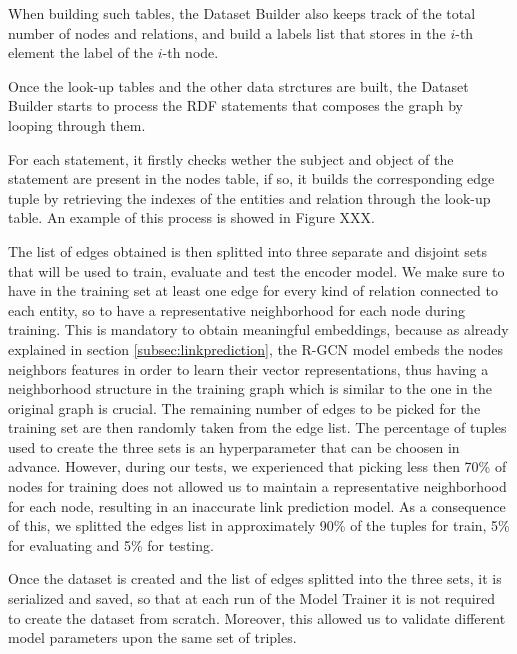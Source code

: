 \documentclass[%
    corpo=13.5pt,
    twoside,
    oldstyle,
    tipotesi=magistrale,
    greek,
    evenboxes
]{toptesi}
\begin{document}
When building such tables, the Dataset Builder also keeps track of the total
number of nodes and relations, and build a labels list that stores in the $i$-th
element the label of the $i$-th node.

Once the look-up tables and the other data strctures are built, the Dataset
Builder starts to process the RDF statements that composes the graph by
looping through them.

For each statement, it firstly checks wether the subject and object of the
statement are present in the nodes table, if so, it builds the corresponding
edge tuple by retrieving the indexes of the entities and relation through the
look-up table.
An example of this process is showed in Figure XXX.

The list of edges obtained is then splitted into three separate and disjoint
sets that will be used to train, evaluate and test the encoder model.
We make sure to have in the training set at least one edge for every kind of
relation connected to each entity, so to have a representative neighborhood for
each node during training.
This is mandatory to obtain meaningful embeddings, because
as already explained in section \ref{subsec:linkprediction}, the R-GCN model
embeds the nodes neighbors features in order to learn their vector
representations, thus having a neighborhood structure in the training graph
which is similar to the one in the original graph is crucial.
The remaining number of edges to be picked for the training set are then
randomly taken from the edge list.
The percentage of tuples used to create the three sets is an
hyperparameter that can be choosen in advance. However, during our tests, we
experienced that picking less then 70\% of nodes for training does not allowed
us to maintain a representative neighborhood for each node, resulting in an
inaccurate link prediction model.
As a consequence of this, we splitted the edges list in
approximately 90\% of the tuples for train, 5\% for evaluating and 5\% for
testing.

Once the dataset is created and the list of edges splitted into the three sets,
it is serialized and saved, so that at each run of the Model Trainer it is not
required to create the dataset from scratch.
Moreover, this allowed us to validate different model parameters upon the
same set of triples.
\end{document}
